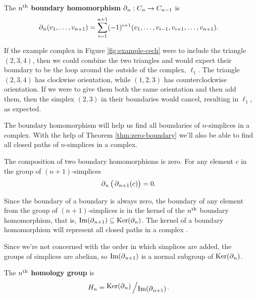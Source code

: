 \begin{definition}\label{def:boundary-homomorphism}
    The \(n\textsuperscript{th}\) \textbf{boundary homomorphism} \(\operatorname{\partial}_n : C_n \to C_{n-1}\) is
    \[
        \operatorname{\partial}_n (v_1,\dots , v_{n+1}) = \sum_{i=1}^{n+1} (-1)^{i+1}
        (v_1,\dots, v_{i-1}, v_{i+1}, \dots, v_{n+1})
        .
    \]
    \cite{hatcher}
\end{definition}

\begin{example}
    If the example complex in Figure \ref{fig:example-cech} were to include the triangle \((2,3,4)\), then we could combine the two triangles and would expect their boundary to be the loop around the outside of the complex, \(\ell_1\).
    The triangle \((2,3,4)\) has clockwise orientation, while \((1,2,3)\) has counterclockwise orientation.
    If we were to give them both the same orientation and then add them, then the simplex \((2,3)\) in their boundaries would cancel, resulting in \(\ell_1\), as expected.
\end{example}

The boundary homomorphism will help us find all boundaries of \(n\)-simplices in a complex.
With the help of Theorem \ref{thm:zero-boundary} we'll also be able to find all closed paths of \(n\)-simplices in a complex.

\begin{theorem}\label{thm:zero-boundary}
    The composition of two boundary homomorphisms is zero.
    For any element \(c\) in the group of \((n+1)\)-simplices
    \begin{align*}
        \operatorname{\partial}_{n} \big( \operatorname{\partial}_{n+1} (c) \big) = 0
        .
    \end{align*}
    \cite{fraleigha}
\end{theorem}

Since the boundary of a boundary is always zero, the boundary of any element from the group of \((n+1)\)-simplices is in the kernel of the \(n\textsuperscript{th}\) boundary homomorphism, that is, \(\operatorname{Im}(\operatorname{\partial}_{n+1}) \subseteq \operatorname{Ker}(\operatorname{\partial}_n)\).
The kernel of a boundary homomorphism will represent all closed paths in a complex \cite{fraleigha}.

Since we're not concerned with the order in which simplices are added, the groups of simplices are abelian, so \(\operatorname{Im}(\operatorname{\partial}_{n+1})\) is a normal subgroup of \(\operatorname{Ker}(\operatorname{\partial}_{n})  \).

\begin{definition}\label{def:nth-homology-group}
    The \(n\textsuperscript{th}\) \textbf{homology group} is \[H_n = \bigslant{\Ker(\boundary_n)}{\Ima(\boundary_{n+1})}.\]
    \cite{fraleigha}
\end{definition}

